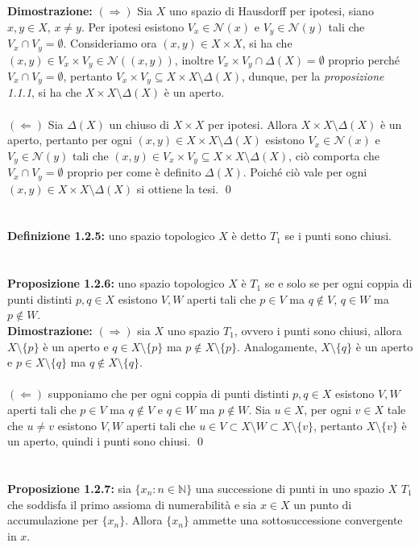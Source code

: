 \documentclass{article}
\begin{document}
\textbf{Dimostrazione:} $(\Rightarrow)$ Sia $X$ uno spazio di Hausdorff per ipotesi, siano $x, y \in X$, $x \neq y$. Per ipotesi esistono $V_x \in \mathcal{N}(x)$ e $V_y \in \mathcal{N}(y)$ tali che $V_x \cap V_y = \emptyset$. Consideriamo ora $(x, y) \in X \times X$, si ha che $(x, y) \in V_x \times V_y \in \mathcal{N}((x, y))$, inoltre $V_x \times V_y \cap \Delta (X) = \emptyset$ proprio perché $V_x \cap V_y = \emptyset$, pertanto $V_x \times V_y \subseteq X \times X \setminus \Delta (X)$, dunque, per la \textit{proposizione 1.1.1}, si ha che $X \times X \setminus \Delta (X)$ è un aperto. \\ \\
$(\Leftarrow)$ Sia $\Delta (X)$ un chiuso di $X \times X$ per ipotesi. Allora $X \times X \setminus \Delta (X)$ è un aperto, pertanto per ogni $(x, y) \in X \times X \setminus \Delta (X)$ esistono $V_x \in \mathcal{N}(x)$ e $V_y \in \mathcal{N}(y)$ tali che $(x, y) \in V_x \times V_y \subseteq X \times X \setminus \Delta (X)$, ciò comporta che $V_x \cap V_y = \emptyset$ proprio per come è definito $\Delta (X)$. Poiché ciò vale per ogni $(x, y) \in X \times X \setminus \Delta (X)$ si ottiene la tesi. \qed \\ \\ \\
\textbf{Definizione 1.2.5:} uno spazio topologico $X$ è detto $T_1$ se i punti sono chiusi. \\ \\ \\
\textbf{Proposizione 1.2.6:} uno spazio topologico $X$ è $T_1$ se e solo se per ogni coppia di punti distinti $p, q \in X$ esistono $V, W$ aperti tali che $p \in V$ ma $q \not\in V$, $q \in W$ ma $p \not\in W$. \\

\textbf{Dimostrazione:} $(\Rightarrow)$ sia $X$ uno spazio $T_1$, ovvero i punti sono chiusi, allora $X \setminus \{ p \}$ è un aperto e $q \in X \setminus \{ p \}$ ma $p \not\in X \setminus \{ p \}$. Analogamente, $X \setminus \{ q \}$ è un aperto e $p \in X \setminus \{ q \}$ ma $q \not\in X \setminus \{ q \}$. \\ \\
$(\Leftarrow)$ supponiamo che per ogni coppia di punti distinti $p, q \in X$ esistono $V, W$ aperti tali che $p \in V$ ma $q \not\in V$ e $q \in W$ ma $p \not\in W$. Sia $u \in X$, per ogni $v \in X$ tale che $u \neq v$ esistono $V, W$ aperti tali che $u \in V \subset X \setminus W \subset X \setminus \{ v \}$, pertanto $X \setminus \{ v \}$ è un aperto, quindi i punti sono chiusi. \qed \\ \\ \\
\textbf{Proposizione 1.2.7:} sia $\{ x_n : n \in \mathbb{N} \}$ una successione di punti in uno spazio $X$ $T_1$ che soddisfa il primo assioma di numerabilità e sia $x \in X$ un punto di accumulazione per $\{ x_n \}$. Allora $\{ x_n \}$ ammette una sottosuccessione convergente in $x$. \\
\end{document}
